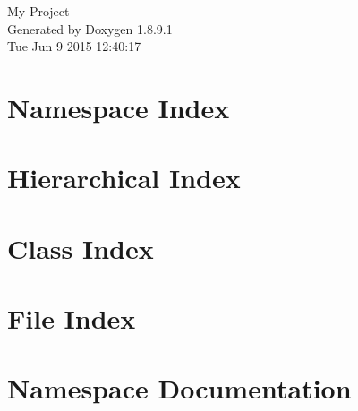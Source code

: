 \documentclass[twoside]{book}
\newcommand{\+}{\discretionary{\mbox{\scriptsize$\hookleftarrow$}}{}{}}
\newcommand{\clearemptydoublepage}{%
  \newpage{\pagestyle{empty}\cleardoublepage}%
}
\begin{document}
\hypersetup{pageanchor=false,
             bookmarks=true,
             bookmarksnumbered=true,
             pdfencoding=unicode
            }
\begin{titlepage}
\vspace*{7cm}
\begin{center}%
{\Large My Project }\\
\vspace*{1cm}
{\large Generated by Doxygen 1.8.9.1}\\
\vspace*{0.5cm}
{\small Tue Jun 9 2015 12:40:17}\\
\end{center}
\end{titlepage}
\clearemptydoublepage
\tableofcontents
\clearemptydoublepage
{}
\hypersetup{pageanchor=true}

\chapter{Namespace Index}

\chapter{Hierarchical Index}

\chapter{Class Index}

\chapter{File Index}

\chapter{Namespace Documentation}

\end{document}
